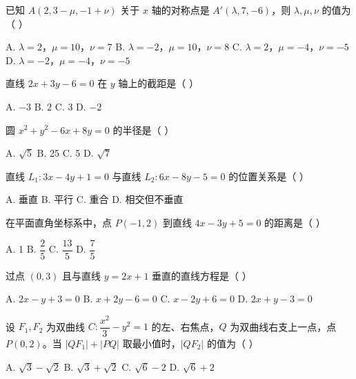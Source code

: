 \documentclass[11pt, a4paper]{article}
\begin{document}
\begin{baitap}[7]
已知 $A(2, 3 - \mu, -1 + \nu)$ 关于 $x$ 轴的对称点是 $A'(\lambda, 7, -6)$，则 $\lambda, \mu, \nu$ 的值为（ ）
\par\vspace{3pt}
\noindent A. $\lambda = 2$，$\mu = 10$，$\nu = 7$ \quad B. $\lambda = -2$，$\mu = 10$，$\nu = 8$ \quad C. $\lambda = 2$，$\mu = -4$，$\nu = -5$ \quad D. $\lambda = -2$，$\mu = -4$，$\nu = -5$
\end{baitap}

\begin{baitap}[8]
直线 $2x + 3y - 6 = 0$ 在 $y$ 轴上的截距是（ ）
\par\vspace{3pt}
\noindent A. $-3$ \quad B. $2$ \quad C. $3$ \quad D. $-2$
\end{baitap}

\begin{baitap}[9]
圆 $x^2 + y^2 - 6x + 8y = 0$ 的半径是（ ）
\par\vspace{3pt}
\noindent A. $\sqrt{5}$ \quad B. 25 \quad C. 5 \quad D. $\sqrt{7}$
\end{baitap}

\begin{baitap}[10]
直线 $L_1: 3x - 4y + 1 = 0$ 与直线 $L_2: 6x - 8y - 5 = 0$ 的位置关系是（ ）
\par\vspace{3pt}
\noindent A. 垂直 \quad B. 平行 \quad C. 重合 \quad D. 相交但不垂直
\end{baitap}

\begin{baitap}[11]
在平面直角坐标系中，点 $P(-1,2)$ 到直线 $4x - 3y + 5 = 0$ 的距离是（ ）
\par\vspace{3pt}
\noindent A. 1 \quad B. $\dfrac{2}{5}$ \quad C. $\dfrac{13}{5}$ \quad D. $\dfrac{7}{5}$
\end{baitap}

\begin{baitap}[12]
过点 $(0,3)$ 且与直线 $y = 2x + 1$ 垂直的直线方程是（ ）
\par\vspace{3pt}
\noindent A. $2x - y + 3 = 0$ \quad B. $x + 2y - 6 = 0$ \quad C. $x - 2y + 6 = 0$ \quad D. $2x + y - 3 = 0$
\end{baitap}

\begin{baitap}[13]
设 $F_1, F_2$ 为双曲线 $C: \dfrac{x^2}{3} - y^2 = 1$ 的左、右焦点，$Q$ 为双曲线右支上一点，点 $P(0,2)$。当 $\lvert QF_1 \rvert + \lvert PQ \rvert$ 取最小值时，$\lvert QF_2 \rvert$ 的值为（ ）
\par\vspace{3pt}
\noindent A. $\sqrt{3} - \sqrt{2}$ \quad B. $\sqrt{3} + \sqrt{2}$ \quad C. $\sqrt{6} - 2$ \quad D. $\sqrt{6} + 2$
\end{baitap}
\end{document}
